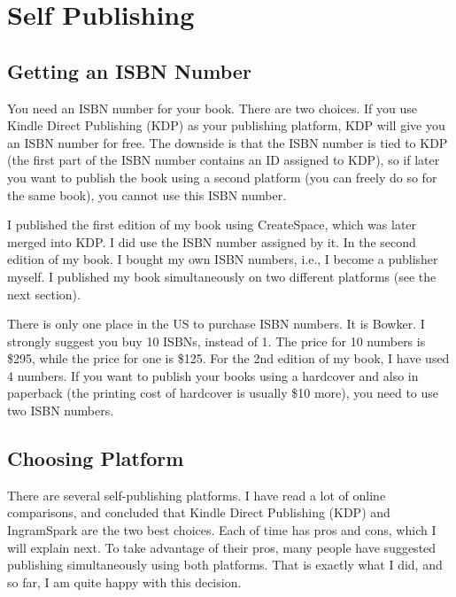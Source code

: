 
\chapter{Self Publishing}
\label{chapter:publishing}

\thispagestyle{empty}

\lipsum[2]


\minitoc
\newpage



\section{Getting an ISBN Number}


You need an ISBN number for your book. There are two choices. 
If you use Kindle Direct Publishing (KDP) as your publishing platform, KDP will give you an
ISBN number for free. The downside is that the ISBN number is tied to KDP (the first part of
the ISBN number contains an ID assigned to KDP), so if later you want to
publish the book using a second platform (you can freely do so for the same book), 
you cannot use this ISBN number. 

I published the first edition of my book using CreateSpace, which was later merged into KDP. I
did use the ISBN number assigned by it. In the second edition of my book. I bought my own ISBN
numbers, i.e., I become a publisher myself. I published my book simultaneously on two different
platforms (see the next section). 

There is only one place in the US to purchase ISBN numbers. It is Bowker. I strongly suggest
you buy 10 ISBNs, instead of 1. The price for 10 numbers is \$295, while the price for one is
\$125. For the 2nd edition of my book, I have used 4 numbers. If you want to publish your books
using a hardcover and also in paperback (the printing cost of hardcover is usually \$10 more), 
you need to use two ISBN numbers.  




\section{Choosing Platform}


There are several self-publishing platforms. I have read a lot of online comparisons, and
concluded that Kindle Direct Publishing (KDP) and IngramSpark are the two best choices. Each of
time has pros and cons, which I will explain next. To take advantage of their pros, many people
have suggested publishing simultaneously using both platforms. That is exactly what I did, and so far,
I am quite happy with this decision. 


